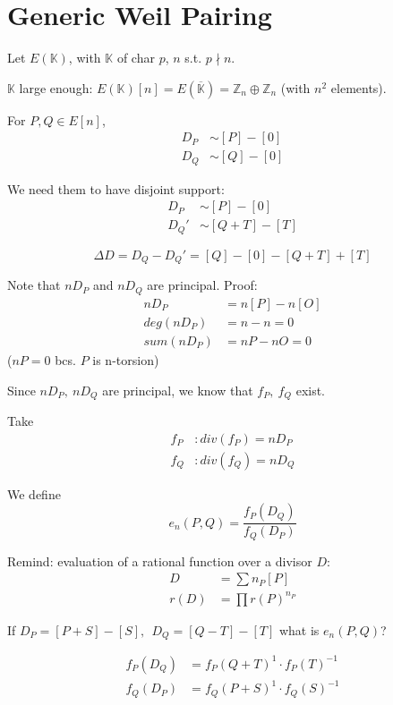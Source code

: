 \documentclass{article}
\theoremstyle{definition}
\begin{document}
\section{Generic Weil Pairing}
Let $E(\mathbb{K})$, with $\mathbb{K}$ of char $p$, $n$ s.t. $p \nmid n$.

$\mathbb{K}$ large enough: $E(\mathbb{K})[n] = E(\mathbb{\overline{K}}) = \mathbb{Z}_n \oplus \mathbb{Z}_n$ (with $n^2$ elements).

For $P, Q \in E[n]$,
\begin{align*}
  D_P &\sim [P] - [0]\\
  D_Q &\sim [Q] - [0]
\end{align*}

We need them to have disjoint support:
\begin{align*}
  D_P &\sim [P] - [0]\\
  D_Q' &\sim [Q+T] - [T]
\end{align*}

$$\Delta D = D_Q - D_Q' = [Q] - [0] - [Q+T] + [T]$$


Note that $n D_P$ and $n D_Q$ are principal. Proof:
\begin{align*}
  n D_P &= n [P] - n [O]\\
  deg(n D_P) &= n - n = 0\\
  sum(n D_P) &= nP - nO = 0
\end{align*}
($nP = 0$ bcs. $P$ is n-torsion)

Since $n D_P,~ n D_Q$ are principal, we know that $f_P,~ f_Q$ exist.

Take
\begin{align*}
  f_P &: div(f_P) = n D_P\\
  f_Q &: div(f_Q) = n D_Q
\end{align*}

We define
$$
e_n(P, Q) = \frac{f_P(D_Q)}{f_Q(D_P)}
$$

Remind: evaluation of a rational function over a divisor $D$:
\begin{align*}
  D &= \sum n_P [P]\\
  r(D) &= \prod r(P)^{n_P}
\end{align*}

If $D_P = [P+S] - [S],~~ D_Q=[Q-T]-[T]$ what is $e_n(P, Q)$?

\begin{align*}
  f_P(D_Q) &= f_P(Q+T)^1 \cdot f_P(T)^{-1}\\
  f_Q(D_P) &= f_Q(P+S)^1 \cdot f_Q(S)^{-1}
\end{align*}
\end{document}
